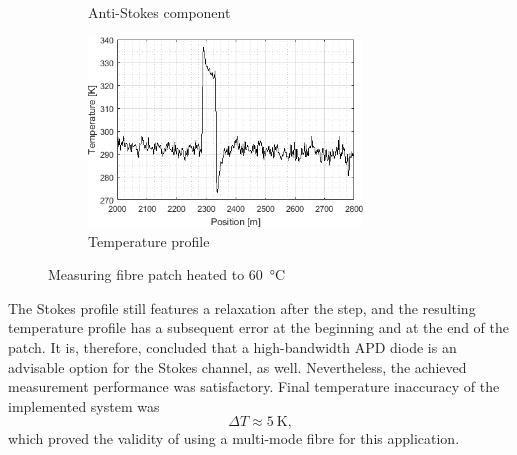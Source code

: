 \documentclass{standalone}
\begin{document}
\begin{figure}[h]
\begin{subfigure}[b]{0.49\textwidth}
		\caption{Anti-Stokes component}
	\end{subfigure}
	\begin{subfigure}[b]{\textwidth}
		\centering
		\includegraphics[width=0.8\textwidth]{apd_60c_temp.png}
		\caption{Temperature profile}
		\label{fig:apd_60c_temp}
	\end{subfigure}
	\caption{Measuring fibre patch heated to \SI{60}{\celsius}}
	\label{fig:apd_60c}
\end{figure}
The Stokes profile still features a relaxation after the step, and the resulting temperature profile has a subsequent error at the beginning and at the end of the patch. It is, therefore, concluded that a high-bandwidth APD diode is an advisable option for the Stokes channel, as well. Nevertheless, the achieved measurement performance was satisfactory. Final temperature inaccuracy of the implemented system was
\begin{equation}
\varDelta T \approx \SI{5}{\kelvin} \textrm{,}
\end{equation}
which proved the validity of using a multi-mode fibre for this application. \\
\end{document}

